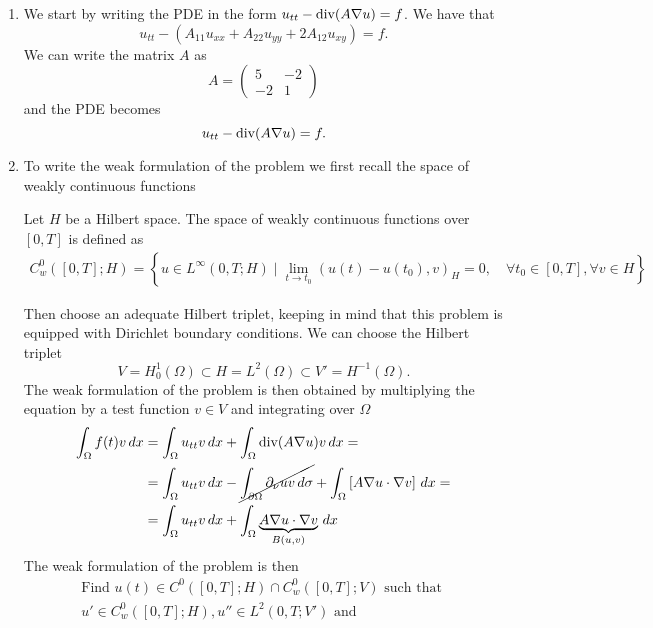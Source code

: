 \begin{enumerate}
    \item We start by writing the PDE in the form \(u_{tt} - \text{div}(A \nabla u) = f\). We have that
    \[
        u_{tt} - \left(A_{11} u_{xx} + A_{22} u_{yy} + 2A_{12} u_{xy}\right) = f.
    \]
    We can write the matrix \(A\) as
    \[
        A = \begin{pmatrix}
            5 & -2 \\
            -2 & 1
        \end{pmatrix}
    \]
    and the PDE becomes
    \[
        u_{tt} - \text{div} (A \nabla u) = f.
    \]
    \item To write the weak formulation of the problem we first recall the space of weakly continuous functions
    \begin{remark}
        Let \(H\) be a Hilbert space. The space of weakly continuous functions over \([0, T]\) is defined as
        \[
            \begin{split}
                C_w^0([0, T]; H) = \left\{ u \in L^\infty(0, T; H) \mid \lim_{t \to t_0} (u(t) - u(t_0), v)_H = 0, \quad \forall t_0 \in [0, T], \forall v \in H \right\}
            \end{split}
        \] 
    \end{remark}
    Then choose an adequate Hilbert triplet, keeping in mind that this problem is equipped with Dirichlet boundary conditions. We can choose the Hilbert triplet
    \[
        V = H^1_0(\Omega) \subset H = L^2(\Omega) \subset V' = H^{-1}(\Omega).
    \]
    The weak formulation of the problem is then obtained by multiplying the equation by a test function \(v \in V\) and integrating over \(\Omega\)
    \begin{align*}
        \int_\Omega f(t) v \, dx &= \int_\Omega u_{tt} v \, dx + \int_\Omega \text{div}(A \nabla u)v \, dx =\\
        &= \int_\Omega u_{tt} v \, dx - \cancel{\int_{\partial\Omega} \partial_\nu u v \, d\sigma} + \int_\Omega \left[A \nabla u \cdot \nabla v\right] \, dx = \\
        &= \int_\Omega u_{tt} v \, dx + \int_\Omega \underbrace{A \nabla u \cdot \nabla v}_{B(u, v)} \, dx
    \end{align*}
    The weak formulation of the problem is then
    \[
        \begin{split}
            \text{Find } u(t) \in C^0([0, T]; H) \cap C_w^0([0, T]; V) \text{ such that } \\
            u' \in C_w^0([0, T]; H), u'' \in L^2(0, T; V') \text{ and } \\

\end{split}\]
\end{enumerate}
